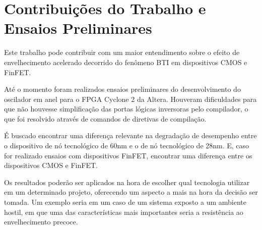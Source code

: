\chapter{Contribuições do Trabalho e Ensaios Preliminares}
Este trabalho pode contribuir com um maior entendimento sobre o efeito de envelhecimento acelerado decorrido do fenômeno BTI em dispositivos CMOS e FinFET.

Até o momento foram realizados ensaios preliminares do desenvolvimento do oscilador em anel para o FPGA Cyclone 2 da Altera. Houveram dificuldades para que não houvesse simplificação das portas lógicas inversoras pelo compilador, o que foi resolvido através de comandos de diretivas de compilação.

É buscado encontrar uma diferença relevante na degradação de desempenho entre o dispositivo de nó tecnológico de 60nm e o de nó tecnológico de 28nm. E, caso for realizado ensaios com dispositivos FinFET, encontrar uma diferença entre os dispositivos CMOS e FinFET.

Os resultados poderão ser aplicados na hora de escolher qual tecnologia utilizar em um determinado projeto, oferecendo um aspecto a mais na hora da decisão ser tomada. Um exemplo seria em um caso de um sistema exposto a um ambiente hostil, em que uma das características mais importantes seria a resistência ao envelhecimento precoce.
